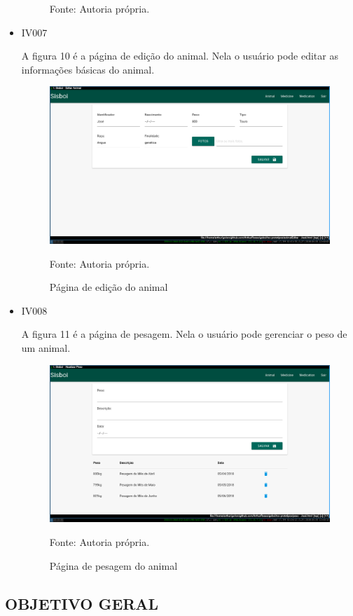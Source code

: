 \begin{itemize}
\begin{figure}[H]
\begin{center}
		Fonte: Autoria própria.
	\end{center}
\end{figure}

\newpage
\item IV007

A figura 10 é a página de edição do animal. Nela o usuário pode editar as informações básicas do animal.
\begin{figure}[]
	\begin{center}
		\caption{Página de edição do animal}
		\includegraphics[width=13cm]{../img/prototipos/editar.png}

		Fonte: Autoria própria.
	\end{center}
\end{figure}

\item IV008

A figura 11 é a página de pesagem. Nela o usuário pode gerenciar o peso de um animal.
\begin{figure}[H]
	\begin{center}
		\caption{Página de pesagem do animal}
		\includegraphics[width=13cm]{../img/prototipos/peso.png}

		Fonte: Autoria própria.
	\end{center}
\end{figure}

\end{itemize}
\subsection{OBJETIVO GERAL}
